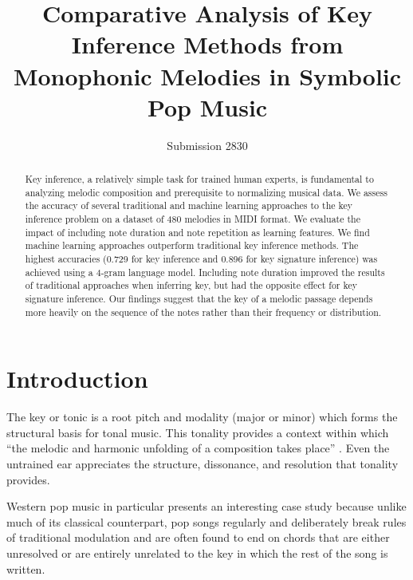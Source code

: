 \documentclass[letterpaper]{article}
\begin{document}
%
\title{Comparative Analysis of Key Inference Methods from Monophonic Melodies in Symbolic Pop Music}
\author{Submission 2830}
\maketitle
\begin{abstract}
Key inference, a relatively simple task for trained human experts, is fundamental to analyzing melodic composition and prerequisite to normalizing musical data.
We assess the accuracy of several traditional and machine learning approaches to the key inference problem on a dataset of 480 melodies in MIDI format. We evaluate the impact of including note duration and note repetition as learning features.
We find machine learning approaches outperform traditional key inference methods. The highest accuracies (0.729 for key inference and 0.896 for key signature inference) was achieved using a 4-gram language model.
Including note duration improved the results of traditional approaches when inferring key, but had the opposite effect for key signature inference. Our findings suggest that the key of a melodic passage depends more heavily on the sequence of the notes rather than their frequency or distribution. 
\end{abstract}

\section{Introduction}

\noindent The key or tonic is a root pitch and modality (major or minor) which forms the structural basis for tonal music. This tonality provides a context within which ``the melodic and harmonic unfolding of a composition takes place'' \cite{vos1996parallel}. Even the untrained ear appreciates the structure, dissonance, and resolution that tonality provides.

Western pop music in particular presents an interesting case study because unlike much of its classical counterpart, pop songs regularly and deliberately break rules of traditional modulation and are often found to end on chords that are either unresolved or are entirely unrelated to the key in which the rest of the song is written.
\end{document}
